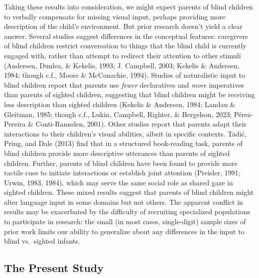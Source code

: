 \documentclass[
  man,floatsintext]{apa6}
\begin{document}
Taking these results into consideration, we might expect parents of blind children to verbally compensate for missing visual input, perhaps providing more description of the child's environment. But prior research doesn't yield a clear answer. Several studies suggest differences in the conceptual features: caregivers of blind children restrict conversation to things that the blind child is currently engaged with, rather than attempt to redirect their attention to other stimuli (Andersen, Dunlea, \& Kekelis, 1993; J. Campbell, 2003; Kekelis \& Andersen, 1984; though c.f., Moore \& McConachie, 1994). Studies of naturalistic input to blind children report that parents use \emph{fewer} declaratives and \emph{more} imperatives than parents of sighted children, suggesting that blind children might be receiving less description than sighted children (Kekelis \& Andersen, 1984; Landau \& Gleitman, 1985; though c.f., Lukin, Campbell, Righter, \& Bergelson, 2023; Pérez-Pereira \& Conti-Ramsden, 2001). Other studies report that parents adapt their interactions to their children's visual abilities, albeit in specific contexts. Tadić, Pring, and Dale (2013) find that in a structured book-reading task, parents of blind children provide more descriptive utterances than parents of sighted children. Further, parents of blind children have been found to provide more tactile cues to initiate interactions or establish joint attention (Preisler, 1991; Urwin, 1983, 1984), which may serve the same social role as shared gaze in sighted children. These mixed results suggest that parents of blind children might alter language input in some domains but not others. The apparent conflict in results may be exacerbated by the difficulty of recruiting specialized populations to participate in research: the small (in most cases, single-digit) sample sizes of prior work limits our ability to generalize about any differences in the input to blind vs.~sighted infants.

\hypertarget{the-present-study}{%
\subsection{The Present Study}\label{the-present-study}}
\end{document}
